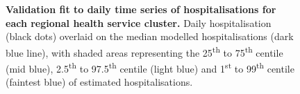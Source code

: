 \begin{figure}[ht]
    \caption{\textbf{Validation fit to daily time series of hospitalisations for each regional health service cluster.} Daily hospitalisation (black dots) overlaid on the median modelled hospitalisations (dark blue line), with shaded areas representing the 25\textsuperscript{th} to 75\textsuperscript{th} centile (mid blue), 2.5\textsuperscript{th} to 97.5\textsuperscript{th} centile (light blue) and 1\textsuperscript{st} to 99\textsuperscript{th} centile (faintest blue) of estimated hospitalisations.}
\end{figure}

